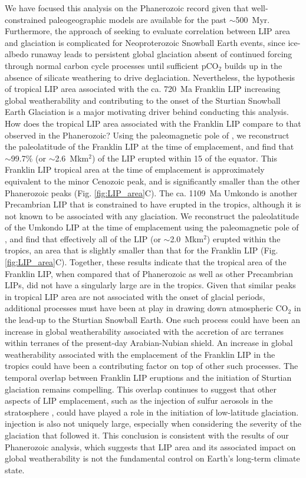 \documentclass[11pt,letterpaper]{article}
\begin{document}
We have focused this analysis on the Phanerozoic record given that well-constrained paleogeographic models are available for the past $\sim$500~Myr. Furthermore, the approach of seeking to evaluate correlation between LIP area and glaciation is complicated for Neoproterozoic Snowball Earth events, since ice-albedo runaway leads to persistent global glaciation absent of continued forcing through normal carbon cycle processes until sufficient pCO$_2$ builds up in the absence of silicate weathering to drive deglaciation. Nevertheless, the hypothesis of tropical LIP area associated with the ca. 720~Ma Franklin LIP increasing global weatherability and contributing to the onset of the Sturtian Snowball Earth Glaciation is a major motivating driver behind conducting this analysis. How does the tropical LIP area associated with the Franklin LIP compare to that observed in the Phanerozoic? Using the paleomagnetic pole of \citet{Denyszyn2009a}, we reconstruct the paleolatitude of the Franklin LIP at the time of emplacement, and find that $\sim$99.7\% (or $\sim$2.6~Mkm$^{2}$) of the LIP erupted within 15\textdegree\xspace of the equator. This Franklin LIP tropical area at the time of emplacement is approximately equivalent to the minor Cenozoic peak, and is significantly smaller than the other Phanerozoic peaks (Fig. \ref{fig:LIP_area}C). The ca. 1109~Ma Umkondo is another Precambrian LIP that is constrained to have erupted in the tropics, although it is not known to be associated with any glaciation. We reconstruct the paleolatitude of the Umkondo LIP at the time of emplacement using the paleomagnetic pole of \citet{Swanson-Hysell2015b}, and find that effectively all of the LIP (or $\sim$2.0~Mkm$^{2}$) erupted within the tropics, an area that is slightly smaller than that for the Franklin LIP (Fig. \ref{fig:LIP_area}C). Together, these results indicate that the tropical area of the Franklin LIP, when compared that of Phanerozoic as well as other Precambrian LIPs, did not have a singularly large are in the tropics. Given that similar peaks in tropical LIP area are not associated with the onset of glacial periods, additional processes must have been at play in drawing down atmospheric CO$_2$ in the lead-up to the Sturtian Snowball Earth. One such process could have been an increase in global weatherability associated with the accretion of arc terranes within terranes of the present-day Arabian-Nubian shield. An increase in global weatherability associated with the emplacement of the Franklin LIP in the tropics could have been a contributing factor on top of other such processes. The temporal overlap between Franklin LIP eruptions \citep{Denyszyn2009a} and the initiation of Sturtian glaciation \citep{Macdonald2010a, MacLennan2018a} remains compelling. This overlap continues to suggest that other aspects of LIP emplacement, such as the injection of sulfur aerosols in the stratosphere \citep{Macdonald2017a}, could have played a role in the initiation of low-latitude glaciation.   injection is also not uniquely large, especially when considering the severity of the glaciation that followed it. This conclusion is consistent with the results of our Phanerozoic analysis, which suggests that LIP area and its associated impact on global weatherability is not the fundamental control on Earth's long-term climate state.
\end{document}
